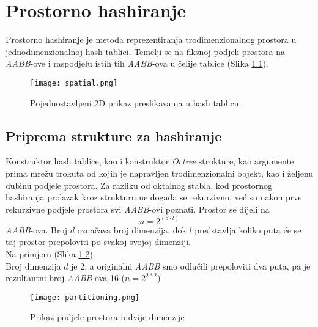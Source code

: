 \chapter{Prostorno hashiranje}
\label{chapter:spatial}

Prostorno hashiranje je metoda reprezentiranja trodimenzionalnog prostora u
jednodimenzionalnoj hash tablici. Temelji se na fiksnoj podjeli prostora na
\textit{AABB}-ove i raspodjelu istih tih \textit{AABB}-ova u čelije tablice (Slika \ref{figure:spatial}). ~\cite{gamedev}

\begin{figure}[h!]
    \centering
    \texttt{[image: spatial.png]}
    \caption {Pojednostavljeni 2D prikaz preslikavanja u hash tablicu.}
    \label{figure:spatial}
\end{figure}

\section{Priprema strukture za hashiranje}

Konstruktor hash tablice, kao i konstruktor \textit{Octree} strukture, kao argumente
prima mrežu trokuta od kojih je napravljen trodimenzionalni objekt, kao i željenu
dubinu podjele prostora. Za razliku od oktalnog stabla, kod prostornog hashiranja
prolazak kroz strukturu ne događa se rekurzivno, već su nakon prve rekurzivne podjele
prostora svi \textit{AABB}-ovi poznati.
Prostor se dijeli na \[n = 2^{(d\cdot l)}\] \textit{AABB}-ova.
Broj $d$ označava broj dimenzija, dok $l$ predstavlja koliko puta će se taj prostor
prepoloviti po svakoj svojoj dimenziji.\\
Na primjeru (Slika \ref{partitioning}):\\
Broj dimenzija $d$ je 2, a originalni \textit{AABB} smo odlučili prepoloviti dva puta, pa je rezultantni broj \textit{AABB}-ova 16 ($n = 2^{2*2}$)

\begin{figure}[h!]
    \centering
    \texttt{[image: partitioning.png]}
    \caption {Prikaz podjele prostora u dvije dimenzije}
    \label{partitioning}
\end{figure}

